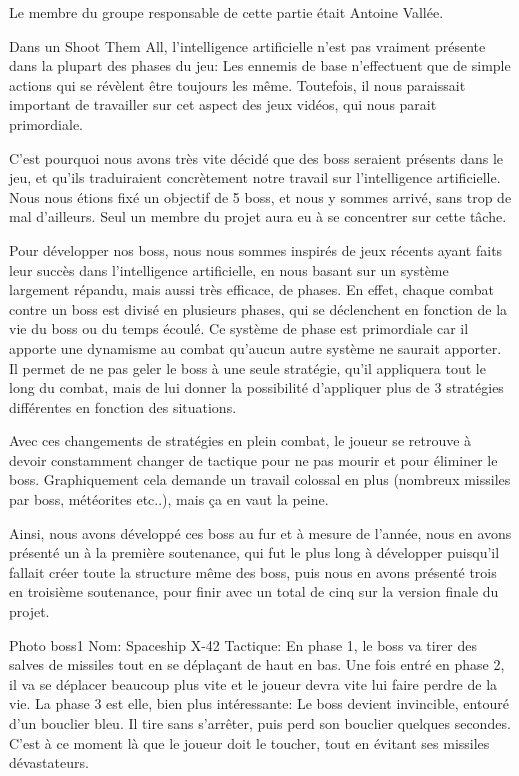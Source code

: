 \par Le membre du groupe responsable de cette partie était Antoine Vallée.

\par Dans un Shoot Them All, l'intelligence artificielle n'est pas vraiment présente dans la plupart des phases du jeu: Les ennemis de base n'effectuent que de simple actions qui se révèlent être toujours les même. Toutefois, il nous paraissait important de travailler sur cet aspect des jeux vidéos, qui nous parait primordiale.
\par C'est pourquoi nous avons très vite décidé que des boss seraient présents dans le jeu, et qu'ils traduiraient concrètement notre travail sur l'intelligence artificielle. Nous nous étions fixé un objectif de 5 boss, et nous y sommes arrivé, sans trop de mal d'ailleurs. Seul un membre du projet aura eu à se concentrer sur cette tâche.
\par Pour développer nos boss, nous nous sommes inspirés de jeux récents ayant faits leur succès dans l'intelligence artificielle, en nous basant sur un système largement répandu, mais aussi très efficace, de phases. En effet, chaque combat contre un boss est divisé en plusieurs phases, qui se déclenchent en fonction de la vie du boss ou du temps écoulé. Ce système de phase est primordiale car il apporte une dynamisme au combat qu'aucun autre système ne saurait apporter. Il permet de ne pas geler le boss à une seule stratégie, qu'il appliquera tout le long du combat, mais de lui donner la possibilité d'appliquer plus de 3 stratégies différentes en fonction des situations.
\par Avec ces changements de stratégies en plein combat, le joueur se retrouve à devoir constamment changer de tactique pour ne pas mourir et pour éliminer le boss. Graphiquement cela demande un travail colossal en plus (nombreux missiles par boss, météorites etc..), mais ça en vaut la peine.
\par Ainsi, nous avons développé ces boss au fur et à mesure de l'année, nous en avons présenté un à la première soutenance, qui fut le plus long à développer puisqu'il fallait créer toute la structure même des boss, puis nous en avons présenté trois en troisième soutenance, pour finir avec un total de cinq sur la version finale du projet.

\par Photo boss1   Nom: Spaceship X-42
               Tactique: En phase 1, le boss va tirer des salves de missiles tout en se déplaçant de haut en bas. Une fois entré en phase 2, il va se déplacer beaucoup plus vite et le joueur devra vite lui faire perdre de la vie. La phase 3 est elle, bien plus intéressante: Le boss devient invincible, entouré d'un bouclier bleu. Il tire sans s'arrêter, puis perd son bouclier quelques secondes. C'est à ce moment là que le joueur doit le toucher, tout en évitant ses missiles dévastateurs.
			   
